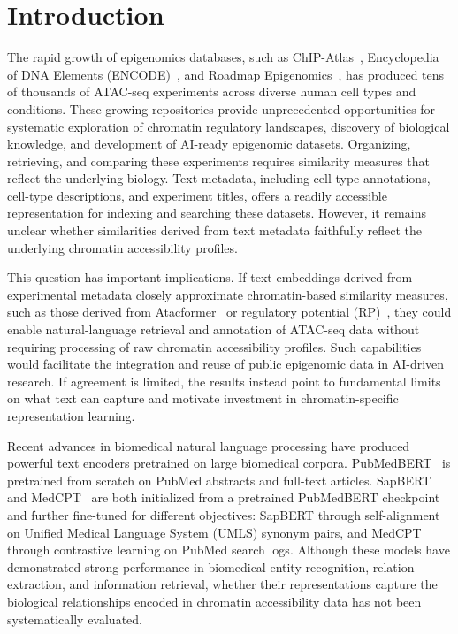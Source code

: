 \documentclass[12pt]{article}
\begin{document}
\section{Introduction}

The rapid growth of epigenomics databases, such as
ChIP-Atlas~\cite{chipatlas}, Encyclopedia of DNA Elements
(ENCODE)~\cite{encode}, and Roadmap Epigenomics~\cite{roadmap}, has produced
tens of thousands of ATAC-seq experiments across diverse human cell types and
conditions. These growing repositories provide unprecedented opportunities for
systematic exploration of chromatin regulatory landscapes, discovery of
biological knowledge, and development of AI-ready epigenomic datasets.
Organizing, retrieving, and comparing these experiments requires similarity
measures that reflect the underlying biology. Text metadata, including
cell-type annotations, cell-type descriptions, and experiment titles, offers a
readily accessible representation for indexing and searching these datasets.
However, it remains unclear whether similarities derived from text metadata
faithfully reflect the underlying chromatin accessibility profiles.

This question has important implications. If text embeddings derived from
experimental metadata closely approximate chromatin-based similarity measures,
such as those derived from Atacformer~\cite{atacformer} or regulatory
potential (RP)~\cite{lisa2}, they could enable natural-language retrieval and
annotation of ATAC-seq data without requiring processing of raw chromatin
accessibility profiles. Such capabilities would facilitate the integration and
reuse of public epigenomic data in AI-driven research. If agreement is
limited, the results instead point to fundamental limits on what text can
capture and motivate investment in chromatin-specific representation
learning.

Recent advances in biomedical natural language processing have produced
powerful text encoders pretrained on large biomedical corpora.
PubMedBERT~\cite{pubmedbert} is pretrained from scratch on PubMed abstracts and
full-text articles. SapBERT~\cite{sapbert} and MedCPT~\cite{medcpt} are both
initialized from a pretrained PubMedBERT checkpoint and further fine-tuned for
different objectives: SapBERT through self-alignment on Unified Medical
Language System (UMLS) synonym pairs, and MedCPT through contrastive learning on
PubMed search logs. Although these models have demonstrated strong performance
in biomedical entity recognition, relation extraction, and information
retrieval, whether their representations capture the biological relationships
encoded in chromatin accessibility data has not been systematically
evaluated.
\end{document}
